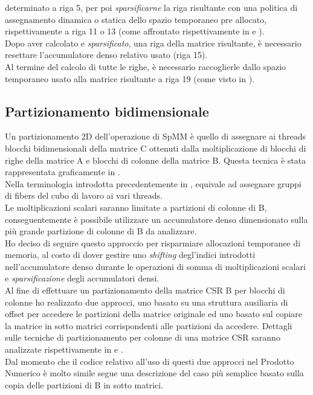 determinato a riga 5, per poi \emph{sparsificarne} la riga risultante con
una politica di assegnamento dinamica o statica dello spazio temporaneo pre allocato,
rispettivamente a riga 11 o 13 (come affrontato rispettivamente in 
 e  ).\\
Dopo aver calcolato e \emph{sparsificato}, una riga della matrice risultante, è 
necessario resettare l'accumulatore denso relativo usato (riga 15).\\
Al termine del calcolo di tutte le righe, è necessario raccoglierle dallo spazio temporaneo usato
alla matrice risultante a riga 19 (come visto in ).\\

\subsection{Partizionamento bidimensionale} \label{chSpMMNum:parti2D}
Un partizionamento 2D dell'operazione di SpMM è quello di assegnare ai threads 
blocchi bidimensionali della matrice C ottenuti dalla moltiplicazione di
blocchi di righe della matrice A e blocchi di colonne della matrice B.
Questa tecnica è stata rappresentata graficamente in .\\
Nella terminologia introdotta precedentemente in , equivale ad
assegnare gruppi di fibers del cubo di lavoro ai vari threads.\\
\voidLine
Le moltiplicazioni scalari saranno limitate a partizioni di colonne di B,
conseguentemente è possibile utilizzare un accumulatore denso dimensionato sulla più grande
partizione di colonne di B da analizzare.\\
Ho deciso di seguire questo approccio per risparmiare allocazioni temporanee di memoria, 
al costo di dover gestire uno \emph{shifting} degl'indici introdotti nell'accumulatore denso
durante le operazioni di
somma di moltiplicazioni scalari e \emph{sparsificazione} degli accumulatori densi.\\
\label{chSpMMNum:csrColPartitioning}
Al fine di effettuare un partizionamento della matrice CSR B per blocchi di colonne 
ho realizzato due approcci, uno basato su una struttura ausiliaria di offset per accedere le partizioni della matrice originale
ed uno basato sul copiare la matrice in sotto matrici corrispondenti alle partizioni da accedere.
Dettagli sulle tecniche di partizionamento per colonne di una matrice CSR saranno analizzate
rispettivamente in  e .\\
Dal momento che il codice relativo all'uso di questi due approcci nel Prodotto Numerico è molto simile
segue una descrizione del caso più semplice basato sulla copia delle partizioni di B in sotto matrici.\\

